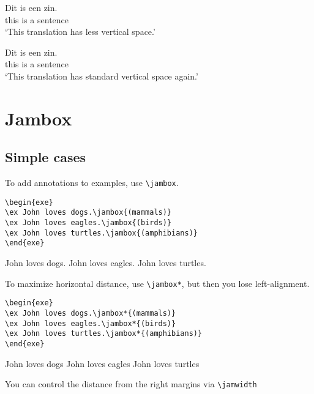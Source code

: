 \documentclass[output=paper]{langscibook}
\newcommand{\cmd}[1]{\texttt{\textbackslash#1}}
\begin{document}
\nogltOffset

\ea
\gll Dit is een zin.\\
     this is a sentence\\
\glt `This translation has less vertical space.'
\z

\resetgltOffset

\ea
\gll Dit is een zin.\\
     this is a sentence\\
\glt `This translation has standard vertical space again.'
\z




\section{Jambox}
\subsection{Simple cases}
To add annotations to examples, use \cmd{jambox}.


\begin{lstlisting}
\begin{exe}
\ex John loves dogs.\jambox{(mammals)}
\ex John loves eagles.\jambox{(birds)}
\ex John loves turtles.\jambox{(amphibians)}
\end{exe}
 \end{lstlisting}

\begin{exe}
\ex John loves dogs.
\ex John loves eagles.
\ex John loves turtles.
\end{exe}



To maximize horizontal distance, use \cmd{jambox*}, but then you lose left-alignment.

\begin{lstlisting}
\begin{exe}
\ex John loves dogs.\jambox*{(mammals)}
\ex John loves eagles.\jambox*{(birds)}
\ex John loves turtles.\jambox*{(amphibians)}
\end{exe}
 \end{lstlisting}

\begin{exe}
\settowidth{}
\ex John loves dogs
\ex John loves eagles
\ex John loves turtles
\end{exe}


You can control the distance from the right margins via \cmd{jamwidth}
\end{document}
